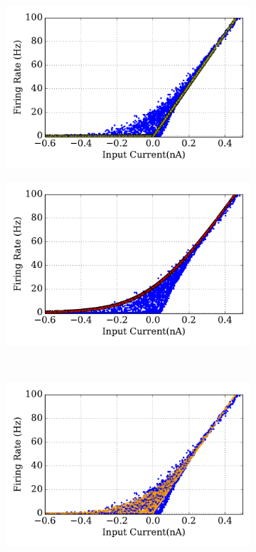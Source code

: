 	\begin{figure}[tbh!]
		\centering
		\begin{subfigure}[t]{0.48\textwidth}
			\includegraphics[width=\textwidth]{pics_iconip/revise_6-5-1.pdf}
		\end{subfigure}
		\begin{subfigure}[t]{0.48\textwidth}
			\includegraphics[width=\textwidth]{pics_iconip/revise_6-5-2.pdf}
		\end{subfigure}\\
		\begin{subfigure}[t]{0.6\textwidth}
			\includegraphics[width=\textwidth]{pics_iconip/revise_6-5-3.pdf}

\end{subfigure}
\end{figure}
